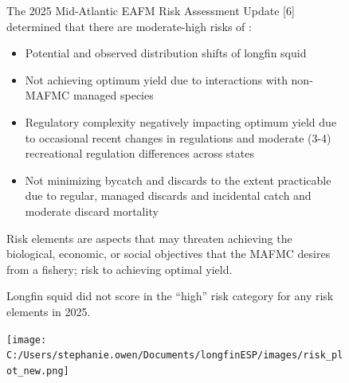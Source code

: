 \documentclass[
  9pt,
  letterpaper,
  DIV=11,
  numbers=noendperiod]{scrartcl}
\providecommand{\tightlist}{%
  \setlength{\itemsep}{0pt}\setlength{\parskip}{0pt}}\usepackage{longtable,booktabs,array}
\begin{document}
\begin{figure}
\begin{minipage}{0.40\linewidth}
\raggedright

The 2025 Mid-Atlantic EAFM Risk Assessment Update {[}6{]} determined
that there are moderate-high risks of :

\begin{itemize}
\tightlist
\item
  Potential and observed distribution shifts of longfin squid
\item
  Not achieving optimum yield due to interactions with non-MAFMC managed
  species
\item
  Regulatory complexity negatively impacting optimum yield due to
  occasional recent changes in regulations and moderate (3-4)
  recreational regulation differences across states
\item
  Not minimizing bycatch and discards to the extent practicable due to
  regular, managed discards and incidental catch and moderate discard
  mortality
\end{itemize}

Risk elements are aspects that may threaten achieving the biological,
economic, or social objectives that the MAFMC desires from a fishery;
risk to achieving optimal yield.

Longfin squid did not score in the ``high'' risk category for any risk
elements in 2025.

\vspace{0.25cm}

\texttt{[image: C:/Users/stephanie.owen/Documents/longfinESP/images/risk\_plot\_new.png]}

\end{minipage}%

\end{figure}%

\newpage
\end{document}
